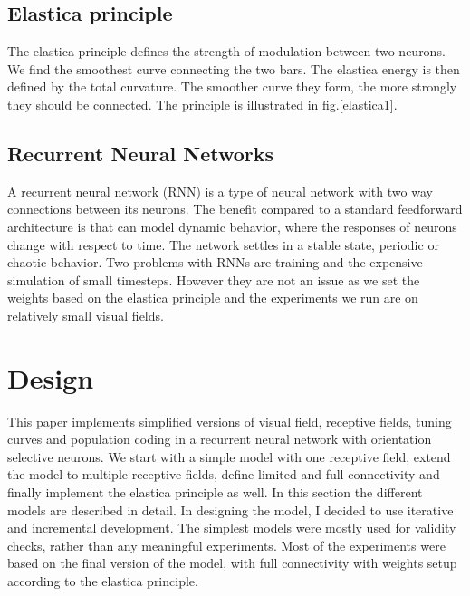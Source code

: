 \section{Elastica principle}

The elastica principle defines the strength of modulation between two neurons. We find the smoothest curve connecting the two bars. The elastica energy is then defined by the total curvature. The smoother curve they form, the more strongly they should be connected. The principle is illustrated in fig.\ref{elastica1}.





\section{Recurrent Neural Networks}

A recurrent neural network (RNN) is a type of neural network with two way connections between its neurons. The benefit compared to a standard feedforward architecture is that can model dynamic behavior, where the responses of neurons change with respect to time. The network settles in a stable state, periodic or chaotic behavior. Two problems with RNNs are training and the expensive simulation of small timesteps. However they are not an issue as we set the weights based on the elastica principle and the experiments we run are on relatively small visual fields.

\chapter{Design}

This paper implements simplified versions of visual field, receptive fields, tuning curves and population coding in a recurrent neural network with orientation selective neurons. We start with a simple model with one receptive field, extend the model to multiple receptive fields, define limited and full connectivity and finally implement the elastica principle as well. In this section the different models are described in detail. In designing the model, I decided to use iterative and incremental development. The simplest models were mostly used for validity checks, rather than any meaningful experiments. Most of the experiments were based on the final version of the model, with full connectivity with weights setup according to the elastica principle.  

